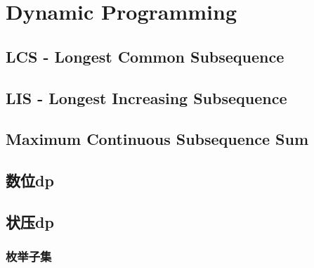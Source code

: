 \section{Dynamic Programming}
	\subsection{LCS - Longest Common Subsequence}
		
	\subsection{LIS - Longest Increasing Subsequence}
		
	\subsection{Maximum Continuous Subsequence Sum}
		
	\subsection{数位dp}
		
	\subsection{状压dp}
		\subsubsection{枚举子集}
			

